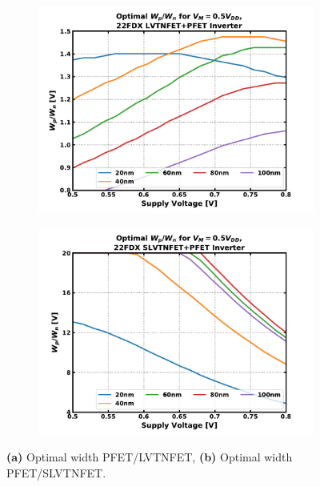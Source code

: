 			\begin{figure}[htb!]
			    \centering
			    \begin{subfigure}{0.5\textwidth}
			        \centering
			        \includegraphics[width=1\textwidth, angle=0]{./figs/design/ratio_lvtnfet_pfet}
			        \caption{ }
			        \label{fig:ratio_lvtn_p}
			    \end{subfigure}%
			    \begin{subfigure}{0.5\textwidth}
			        \centering
			        \includegraphics[width=1\textwidth, angle=0]{./figs/design/ratio_slvtnfet_pfet}
			        \caption{ }
			        \label{fig:ratio_slvtn_p}
			    \end{subfigure}
			    \label{fig:opt_ratio}
			    \caption{\textbf{(a)} Optimal width PFET/LVTNFET, \textbf{(b)} Optimal width PFET/SLVTNFET.}
			\end{figure} 


